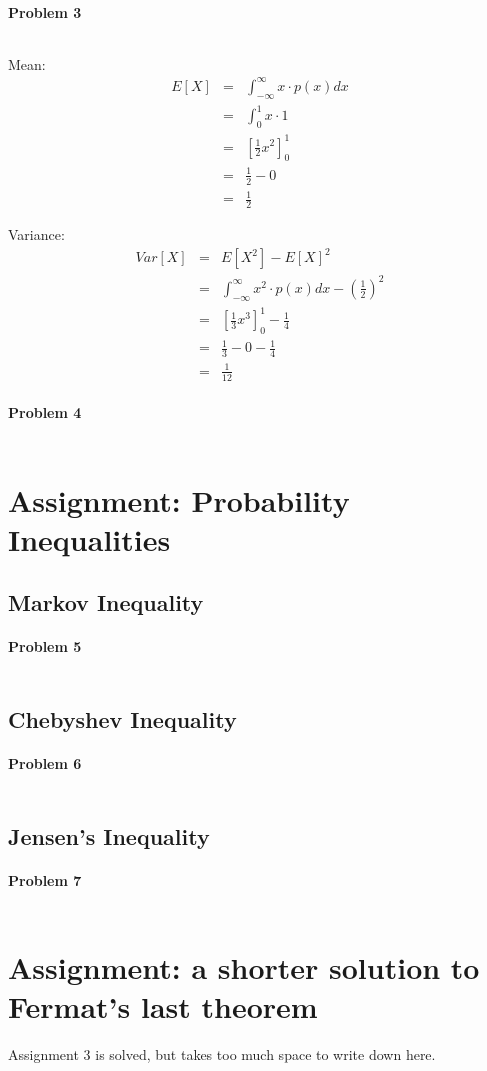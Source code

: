 \documentclass{article}
\begin{document}
\paragraph*{Problem 3}
$\;$ 

Mean:
\begin{eqnarray}
E[X] &=& \int_{-\infty}^{\infty}x \cdot p(x) dx\\
&=& \int_0^1 x \cdot 1\\
&=& \left[ \frac{1}{2} x^2\right] _0^1\\
&=& \frac{1}{2} - 0\\
&=& \frac{1}{2}
\end{eqnarray}

Variance:
\begin{eqnarray}
Var[X] &=& E[X^2] - E[X]^2\\
&=& \int_{-\infty}^{\infty}x^2 \cdot p(x) dx - \left(\frac{1}{2}\right)^2\\
&=& \left[\frac{1}{3} x^3\right]_0^1 - \frac{1}{4}\\
&=& \frac{1}{3} - 0 - \frac{1}{4}\\
&=& \frac{1}{12}
\end{eqnarray}

\paragraph*{Problem 4}
$\;$ 


\section{Assignment: Probability Inequalities}
\subsection{Markov Inequality}

\paragraph*{Problem 5}
$\;$ 

\subsection{Chebyshev Inequality}

\paragraph*{Problem 6}
$\;$ 

\subsection{Jensen's Inequality}

\paragraph*{Problem 7}
$\;$ 




\section{Assignment: a shorter solution to Fermat's last theorem }
Assignment 3 is solved, but takes too much space to write down here.
\end{document}
